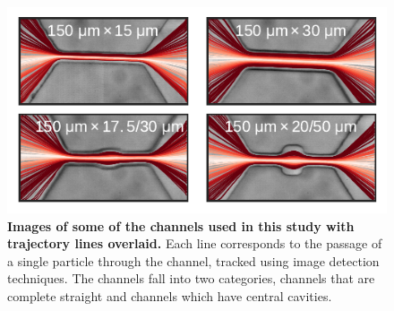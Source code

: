 		\begin{figure}
			\includegraphics[width=\textwidth]{trajectories.pdf}
			\caption{\textbf{Images of some of the channels used in this study with trajectory lines overlaid.} Each line corresponds to the passage of a single particle through the channel, tracked using image detection techniques. The channels fall into two categories, channels that are complete straight and channels which have central cavities.}
			\label{fig:trajectories}
		\end{figure}

		
		
